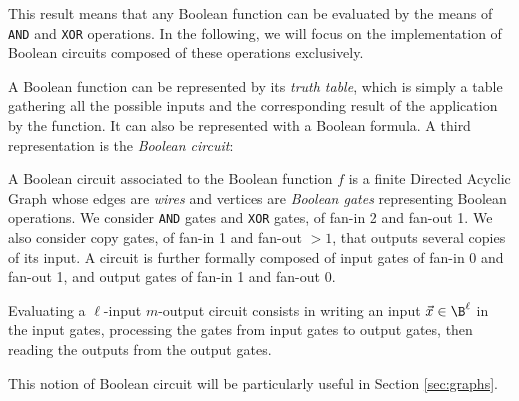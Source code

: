 This result means that any Boolean function can be evaluated by the means of \texttt{AND} and \texttt{XOR} operations. In the following, we will focus on the implementation of Boolean circuits composed of these operations exclusively.


A Boolean function can be represented by its \emph{truth table}, which is simply a table gathering all the possible inputs and the corresponding result of the application by the function. It can also be represented with a Boolean formula. A third representation is the \emph{Boolean circuit}:

\begin{definition}
    A Boolean circuit associated to the Boolean function $f$ is a finite Directed Acyclic Graph whose edges are \emph{wires} and vertices are \emph{Boolean gates} representing Boolean operations. We consider \texttt{AND} gates and \texttt{XOR} gates, of fan-in 2 and fan-out 1. We also consider copy gates, of fan-in 1 and fan-out $>1$, that outputs several copies of its input. A circuit is further formally composed of input gates of fan-in 0 and fan-out 1, and output gates of fan-in 1 and fan-out 0.
    
    Evaluating a $\ell$-input $m$-output circuit consists in writing an input $\vec{x} \in \B^\ell$ in the input gates, processing the gates from input gates to output gates, then reading the outputs from the output gates.

\end{definition}


This notion of Boolean circuit will be particularly useful in Section \ref{sec:graphs}.

